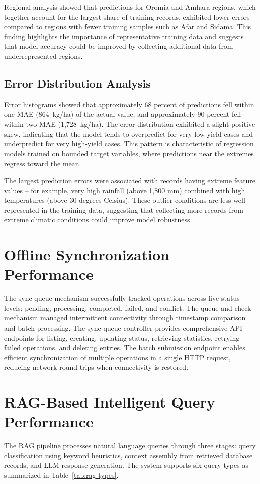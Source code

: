 \documentclass[12pt,a4paper,oneside]{report}
\begin{document}
Regional analysis showed that predictions for Oromia and Amhara regions, which together account for the largest share of training records, exhibited lower errors compared to regions with fewer training samples such as Afar and Sidama. This finding highlights the importance of representative training data and suggests that model accuracy could be improved by collecting additional data from underrepresented regions.

\subsection{Error Distribution Analysis}
Error histograms showed that approximately 68 percent of predictions fell within one MAE (864~kg/ha) of the actual value, and approximately 90 percent fell within two MAE (1,728~kg/ha). The error distribution exhibited a slight positive skew, indicating that the model tends to overpredict for very low-yield cases and underpredict for very high-yield cases. This pattern is characteristic of regression models trained on bounded target variables, where predictions near the extremes regress toward the mean.

The largest prediction errors were associated with records having extreme feature values -- for example, very high rainfall (above 1,800 mm) combined with high temperatures (above 30 degrees Celsius). These outlier conditions are less well represented in the training data, suggesting that collecting more records from extreme climatic conditions could improve model robustness.

\section{Offline Synchronization Performance}
The sync queue mechanism successfully tracked operations across five status levels: pending, processing, completed, failed, and conflict. The queue-and-check mechanism managed intermittent connectivity through timestamp comparison and batch processing. The sync queue controller provides comprehensive API endpoints for listing, creating, updating status, retrieving statistics, retrying failed operations, and deleting entries. The batch submission endpoint enables efficient synchronization of multiple operations in a single HTTP request, reducing network round trips when connectivity is restored.

\section{RAG-Based Intelligent Query Performance}
The RAG pipeline processes natural language queries through three stages: query classification using keyword heuristics, context assembly from retrieved database records, and LLM response generation. The system supports six query types as summarized in Table~\ref{tab:rag-types}.
\end{document}
